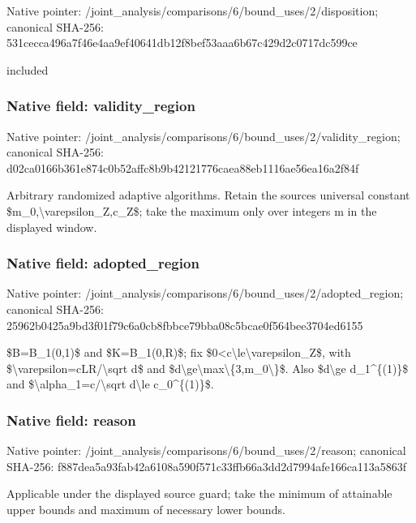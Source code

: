 \documentclass[10pt,a4paper]{article}
\begin{document}
Native pointer: /joint\_analysis/comparis\allowbreak{}ons/6/bound\_uses/2/dispo\allowbreak{}sition; canonical SHA-256: 531cecca496a7f46e4aa9ef4\allowbreak{}0641db12f8bef53aaa6b67c4\allowbreak{}29d2c0717dc599ce


included


\subsubsection{Native field: validity\_region}


Native pointer: /joint\_analysis/comparis\allowbreak{}ons/6/bound\_uses/2/valid\allowbreak{}ity\_region; canonical SHA-256: d02ca0166b361e874c0b52af\allowbreak{}fc8b9b42121776caea88eb11\allowbreak{}16ae56ea16a2f84f


Arbitrary randomized adaptive algorithms. Retain the sources universal constant \$m\_0,\textbackslash{}varepsilon\_Z,c\_Z\$; take the maximum only over integers m in the displayed window.


\subsubsection{Native field: adopted\_region}


Native pointer: /joint\_analysis/comparis\allowbreak{}ons/6/bound\_uses/2/adopt\allowbreak{}ed\_region; canonical SHA-256: 25962b0425a9bd3f01f79c6a\allowbreak{}0cb8fbbce79bba08c5bcae0f\allowbreak{}564bee3704ed6155


\$B=B\_1(0,1)\$ and \$K=B\_1(0,R)\$; fix \$0<c\textbackslash{}le\textbackslash{}varepsilon\_Z\$, with \$\textbackslash{}varepsilon=cLR/\textbackslash{}sqrt d\$ and \$d\textbackslash{}ge\textbackslash{}max\textbackslash{}\{3,m\_0\textbackslash{}\}\$. Also \$d\textbackslash{}ge d\_1\textasciicircum{}\{(1)\}\$ and \$\textbackslash{}alpha\_1=c/\textbackslash{}sqrt d\textbackslash{}le c\_0\textasciicircum{}\{(1)\}\$.


\subsubsection{Native field: reason}


Native pointer: /joint\_analysis/comparis\allowbreak{}ons/6/bound\_uses/2/reaso\allowbreak{}n; canonical SHA-256: f887dea5a93fab42a6108a59\allowbreak{}0f571c33ffb66a3dd2d7994a\allowbreak{}fe166ca113a5863f


Applicable under the displayed source guard; take the minimum of attainable upper bounds and maximum of necessary lower bounds.
\end{document}

